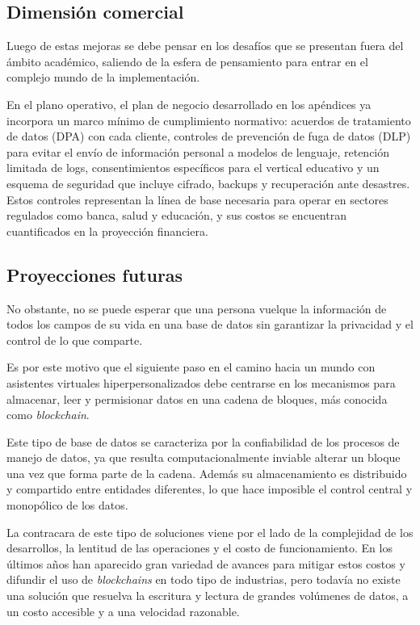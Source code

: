 \subsection{Dimensión comercial}

Luego de estas mejoras se debe pensar en los desafíos que se presentan fuera del ámbito académico, saliendo de la esfera de pensamiento para entrar en el complejo mundo de la implementación.

En el plano operativo, el plan de negocio desarrollado en los apéndices ya incorpora un marco mínimo de cumplimiento normativo: acuerdos de tratamiento de datos (DPA) con cada cliente, controles de prevención de fuga de datos (DLP) para evitar el envío de información personal a modelos de lenguaje, retención limitada de logs, consentimientos específicos para el vertical educativo y un esquema de seguridad que incluye cifrado, backups y recuperación ante desastres. Estos controles representan la línea de base necesaria para operar en sectores regulados como banca, salud y educación, y sus costos se encuentran cuantificados en la proyección financiera.

\subsection{Proyecciones futuras}

No obstante, no se puede esperar que una persona vuelque la información de todos los campos de su vida en una base de datos sin garantizar la privacidad y el control de lo que comparte.

Es por este motivo que el siguiente paso en el camino hacia un mundo con asistentes virtuales hiperpersonalizados debe centrarse en los mecanismos para almacenar, leer y permisionar datos en una cadena de bloques, más conocida como \textit{blockchain}.

Este tipo de base de datos se caracteriza por la confiabilidad de los procesos de manejo de datos, ya que resulta computacionalmente inviable alterar un bloque una vez que forma parte de la cadena. Además su almacenamiento es distribuido y compartido entre entidades diferentes, lo que hace imposible el control central y monopólico de los datos.

La contracara de este tipo de soluciones viene por el lado de la complejidad de los desarrollos, la lentitud de las operaciones y el costo de funcionamiento. En los últimos años han aparecido gran variedad de avances para mitigar estos costos y difundir el uso de \textit{blockchains} en todo tipo de industrias, pero todavía no existe una solución que resuelva la escritura y lectura de grandes volúmenes de datos, a un costo accesible y a una velocidad razonable.

